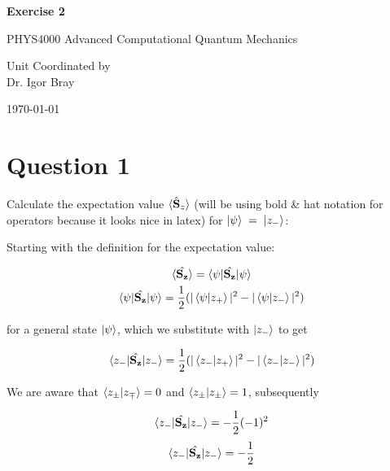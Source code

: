 \documentclass{article}
\let\oldhat\hat
\renewcommand{\hat}[1]{\oldhat{\mathbf{#1}}}
\begin{document}
\newpage
\begin{center}
       
       \vspace*{1cm}
        \LARGE
       \textbf{Exercise 2}

       \vspace{0.5cm}
        PHYS4000
        Advanced Computational Quantum Mechanics
            
       \vspace{1.5cm}

       \bigskip

       Unit Coordinated by\\
       Dr. Igor Bray
            
       \vspace{0.8cm}
     
            
       
        \today
            
\end{center}
\newpage


\section{Question 1}

    Calculate the expectation value $\braket{\hat{S}_z}$ (will be using bold \& hat notation for operators because
    it looks nice in latex) for $\ket{\psi}\;=\;\ket{z_-}$:
    \medskip

    Starting with the definition for the expectation value:

    \begin{gather}
        \braket{\hat{S_z}} = \braket{\psi|\hat{S_z}|\psi}\\
        \braket{\psi|\hat{S_z}|\psi} = \frac{1}{2}(|\braket{\psi|z_+}|^2 - |\braket{\psi|z_-}|^2)
    \end{gather}

    for a general state $\ket{\psi}$, which we substitute with $\ket{z_-}$ to get

    \begin{gather}
        \braket{z_-|\hat{S_z}|z_-} = \frac{1}{2}(|\braket{z_-|z_+}|^2 - |\braket{z_-|z_-}|^2)
    \end{gather}

    We are aware that $\braket{z_{\pm}|z_{\mp}} = 0$ and  $\braket{z_{\pm}|z_{\pm}} = 1$, subsequently

    \begin{gather*}
        \braket{z_-|\hat{S_z}|z_-} = -\frac{1}{2}(-1)^2
    \end{gather*}
    \begin{gather}
        \braket{z_-|\hat{S_z}|z_-} = -\frac{1}{2}
    \end{gather}
\end{document}

